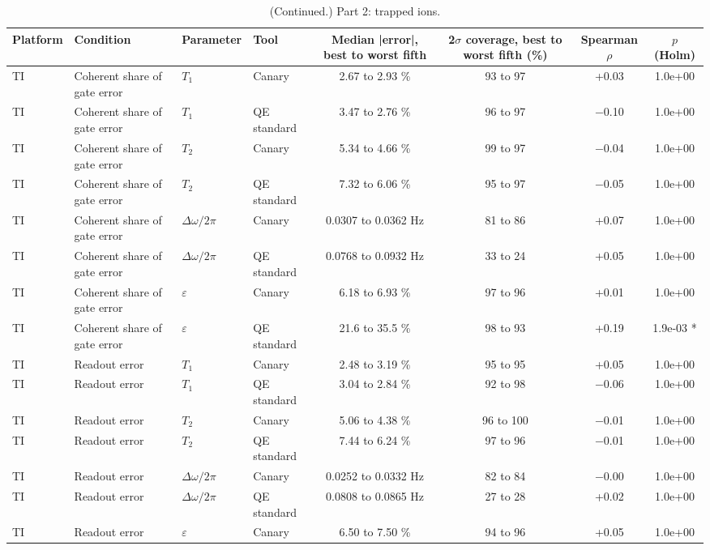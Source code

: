 \begin{table}[!t]
\centering
\footnotesize
\caption{(Continued.) Part 2: trapped ions.}
\label{tab:s6b}
\begin{adjustbox}{max width=\linewidth}
\begin{tabular}{llllcccc}
\hline
Platform & Condition & Parameter & Tool & Median |error|, best to worst fifth & 2$\sigma$ coverage, best to worst fifth (\%) & Spearman $\rho$ & $p$ (Holm) \\
\hline
TI & Coherent share of gate error & $T_1$ & Canary & 2.67 to 2.93 \% & 93 to 97 & +0.03 & 1.0e+00 \\
TI & Coherent share of gate error & $T_1$ & QE standard & 3.47 to 2.76 \% & 96 to 97 & $-$0.10 & 1.0e+00 \\
TI & Coherent share of gate error & $T_2$ & Canary & 5.34 to 4.66 \% & 99 to 97 & $-$0.04 & 1.0e+00 \\
TI & Coherent share of gate error & $T_2$ & QE standard & 7.32 to 6.06 \% & 95 to 97 & $-$0.05 & 1.0e+00 \\
TI & Coherent share of gate error & $\Delta\omega/2\pi$ & Canary & 0.0307 to 0.0362 Hz & 81 to 86 & +0.07 & 1.0e+00 \\
TI & Coherent share of gate error & $\Delta\omega/2\pi$ & QE standard & 0.0768 to 0.0932 Hz & 33 to 24 & +0.05 & 1.0e+00 \\
TI & Coherent share of gate error & $\varepsilon$ & Canary & 6.18 to 6.93 \% & 97 to 96 & +0.01 & 1.0e+00 \\
TI & Coherent share of gate error & $\varepsilon$ & QE standard & 21.6 to 35.5 \% & 98 to 93 & +0.19 & 1.9e-03 * \\
TI & Readout error & $T_1$ & Canary & 2.48 to 3.19 \% & 95 to 95 & +0.05 & 1.0e+00 \\
TI & Readout error & $T_1$ & QE standard & 3.04 to 2.84 \% & 92 to 98 & $-$0.06 & 1.0e+00 \\
TI & Readout error & $T_2$ & Canary & 5.06 to 4.38 \% & 96 to 100 & $-$0.01 & 1.0e+00 \\
TI & Readout error & $T_2$ & QE standard & 7.44 to 6.24 \% & 97 to 96 & $-$0.01 & 1.0e+00 \\
TI & Readout error & $\Delta\omega/2\pi$ & Canary & 0.0252 to 0.0332 Hz & 82 to 84 & $-$0.00 & 1.0e+00 \\
TI & Readout error & $\Delta\omega/2\pi$ & QE standard & 0.0808 to 0.0865 Hz & 27 to 28 & +0.02 & 1.0e+00 \\
TI & Readout error & $\varepsilon$ & Canary & 6.50 to 7.50 \% & 94 to 96 & +0.05 & 1.0e+00 \\

\end{tabular}
\end{adjustbox}
\end{table}
